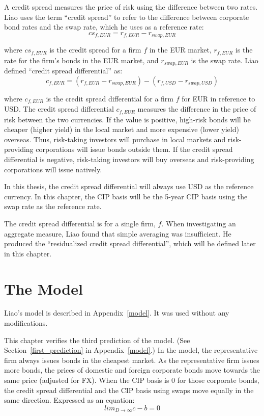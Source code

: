 A credit spread measures the price of risk using the difference between two rates.  Liao uses the term ``credit spread'' to refer to the difference between corporate bond rates and the swap rate, which he uses as a reference rate:
\begin{equation}
  \label{credit_spread_eqn}
cs_{f,EUR} = r_{f,EUR} - r_{swap,EUR}
\end{equation}

\noindent where $cs_{f,EUR}$ is the credit spread for a firm $f$ in the EUR market,  $r_{f,EUR}$ is the rate for the firm's bonds in the EUR market, and $r_{swap,EUR}$ is the swap rate.  Liao defined ``credit spread differential'' as:
\begin{equation}
  \label{credit_spread_diff_eqn}
c_{f,EUR} = (r_{f,EUR} - r_{swap,EUR}) - (r_{f,USD} - r_{swap,USD}) 
\end{equation}

\noindent where $c_{f,EUR}$ is the credit spread differential for a firm $f$ for EUR in reference to USD.  The credit spread differential $c_{f,EUR}$ measures the difference in the price of risk between the two currencies.  If the value is positive, high-risk bonds will be cheaper (higher yield) in the local market and more expensive (lower yield) overseas.   Thus, risk-taking investors will purchase in local markets and risk-providing corporations will issue bonds outside them.  If the credit spread differential is negative, risk-taking investors will buy overseas and risk-providing corporations will issue natively.

In this thesis, the credit spread differential will always use USD as the reference currency.  In this chapter, the CIP basis will be the 5-year CIP basis using the swap rate as the reference rate. 

The credit spread differential is for a single firm, $f$.  When investigating an aggregate measure, Liao found that simple averaging was insufficient.  He produced the ``residualized credit spread differential'', which will be defined later in this chapter.


\section{The Model}

Liao's model is described in Appendix~\ref{model}.  It was used without any modifications.

This chapter verifies the third prediction of the model.  (See Section~\ref{first_prediction} in Appendix~\ref{model}.)  In the model, the representative firm always issues bonds in the cheapest market.  As the representative firm issues more bonds, the prices of domestic and foreign corporate bonds move towards the same price (adjusted for FX).  When the CIP basis is 0 for those corporate bonds, the credit spread differential and the CIP basis using swaps move equally in the same direction.  Expressed as an equation:
\begin{equation}
  \label{third_prediction}
  lim_{D \to \infty} c-b = 0
\end{equation}

